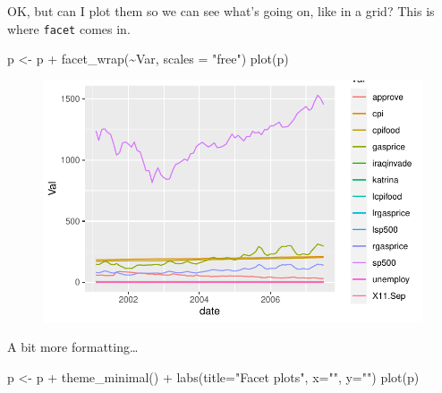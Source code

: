 \documentclass[
  letterpaper,
]{book}
\newenvironment{Shaded}{\begin{snugshade}}{\end{snugshade}}
\newcommand{\AttributeTok}[1]{\textcolor[rgb]{0.40,0.45,0.13}{#1}}
\newcommand{\FunctionTok}[1]{\textcolor[rgb]{0.28,0.35,0.67}{#1}}
\newcommand{\NormalTok}[1]{\textcolor[rgb]{0.00,0.23,0.31}{#1}}
\newcommand{\OtherTok}[1]{\textcolor[rgb]{0.00,0.23,0.31}{#1}}
\newcommand{\SpecialCharTok}[1]{\textcolor[rgb]{0.37,0.37,0.37}{#1}}
\newcommand{\StringTok}[1]{\textcolor[rgb]{0.13,0.47,0.30}{#1}}
\begin{document}
OK, but can I plot them so we can see what's going on, like in a grid?
This is where \texttt{facet} comes in.

\begin{Shaded}
\begin{Highlighting}[]
\NormalTok{p  }\OtherTok{\textless{}{-}}\NormalTok{ p }\SpecialCharTok{+}
  \FunctionTok{facet\_wrap}\NormalTok{(}\SpecialCharTok{\textasciitilde{}}\NormalTok{Var, }\AttributeTok{scales =} \StringTok{"free"}\NormalTok{)}
\FunctionTok{plot}\NormalTok{(p)}
\end{Highlighting}
\end{Shaded}

\begin{figure}[H]

{\centering \includegraphics{Appendix1_files/figure-pdf/unnamed-chunk-9-1.pdf}

}

\end{figure}

A bit more formatting\ldots{}

\begin{Shaded}
\begin{Highlighting}[]
\NormalTok{p  }\OtherTok{\textless{}{-}}\NormalTok{ p }\SpecialCharTok{+}
  \FunctionTok{theme\_minimal}\NormalTok{() }\SpecialCharTok{+} 
  \FunctionTok{labs}\NormalTok{(}\AttributeTok{title=}\StringTok{"Facet plots"}\NormalTok{, }\AttributeTok{x=}\StringTok{""}\NormalTok{, }\AttributeTok{y=}\StringTok{""}\NormalTok{)}
\FunctionTok{plot}\NormalTok{(p)}
\end{Highlighting}
\end{Shaded}
\end{document}
